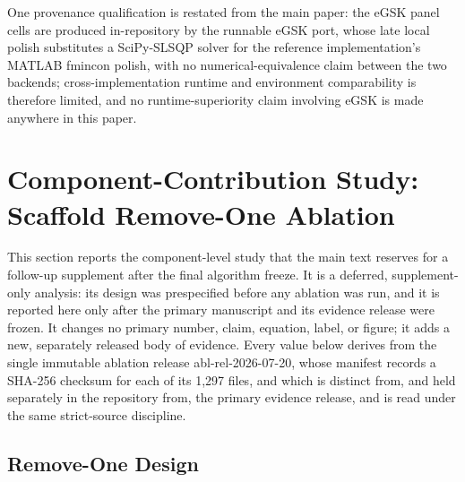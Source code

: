 \documentclass[algorithms,article,submit,moreauthors,pdftex]{Definitions/mdpi}
\newcommand{\egsk}{eGSK}
\begin{document}
One provenance qualification is restated from the main paper: the
\egsk{} panel cells are produced in-repository by the runnable \egsk{}
port, whose late local polish substitutes a SciPy-SLSQP solver for the
reference implementation's MATLAB fmincon polish, with no numerical-equivalence
claim between the two backends; cross-implementation runtime and
environment comparability is therefore limited, and no
runtime-superiority claim involving \egsk{} is made anywhere in this paper.

\section{Component-Contribution Study: Scaffold Remove-One Ablation}\label{sec:supp:ablation}

This section reports the component-level study that the main text reserves
for a follow-up supplement after the final algorithm freeze.  It is a
deferred, supplement-only analysis: its design was prespecified before any
ablation was run, and it is reported here only after the primary manuscript
and its evidence release were frozen.  It
changes no primary number, claim, equation, label, or figure; it adds a new,
separately released body of evidence.  Every value below derives from the
single immutable ablation release abl-rel-2026-07-20, whose manifest
records a SHA-256 checksum for each of its 1{,}297 files, and which is
distinct from, and held separately in the repository from, the primary
evidence release, and is read under the same strict-source discipline.

\subsection{Remove-One Design}\label{sec:supp:ablation:design}
\end{document}
